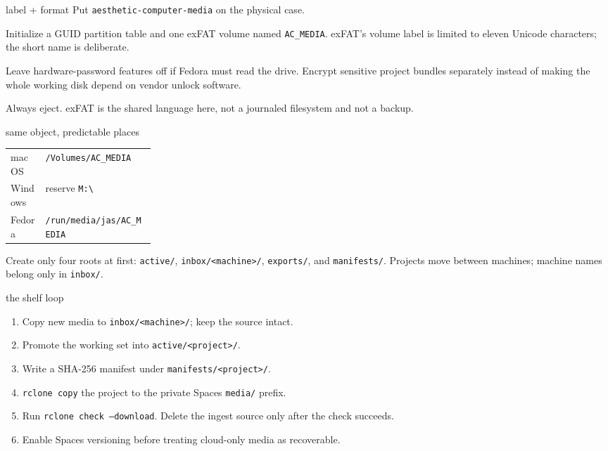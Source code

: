 \documentclass[10pt,letterpaper]{article}
\begin{document}
\begin{gearcard}{label + format}
\gearcheck Put \texttt{aesthetic-computer-media} on the physical case.\par
\gearcheck Initialize a GUID partition table and one exFAT volume named
\texttt{AC\_MEDIA}. exFAT's volume label is limited to eleven Unicode
characters; the short name is deliberate.\par
\gearcheck Leave hardware-password features off if Fedora must read the drive.
Encrypt sensitive project bundles separately instead of making the whole
working disk depend on vendor unlock software.\par
\gearcheck Always eject. exFAT is the shared language here, not a journaled
filesystem and not a backup.
\end{gearcard}

\begin{gearcard}{same object, predictable places}
\begin{tabularx}{\linewidth}{@{}p{0.24\linewidth}Y@{}}
macOS & \texttt{/Volumes/AC\_MEDIA} \\
Windows & reserve \texttt{M:\textbackslash} \\
Fedora & \texttt{/run/media/jas/AC\_MEDIA} \\
\end{tabularx}
\vspace{0.25em}
Create only four roots at first:
\texttt{active/}, \texttt{inbox/<machine>/}, \texttt{exports/}, and
\texttt{manifests/}. Projects move between machines; machine names belong only
in \texttt{inbox/}.
\end{gearcard}

\begin{gearcard}{the shelf loop}
\begin{enumerate}
  \item Copy new media to \texttt{inbox/<machine>/}; keep the source intact.
  \item Promote the working set into \texttt{active/<project>/}.
  \item Write a SHA-256 manifest under \texttt{manifests/<project>/}.
  \item \texttt{rclone copy} the project to the private Spaces
        \texttt{media/} prefix.
  \item Run \texttt{rclone check --download}. Delete the ingest source only
        after the check succeeds.
  \item Enable Spaces versioning before treating cloud-only media as recoverable.
\end{enumerate}
\end{gearcard}
\end{document}
